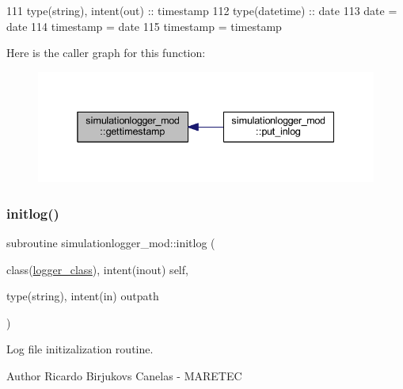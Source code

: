 \begin{DoxyCode}
111     \textcolor{keywordtype}{type}(string), \textcolor{keywordtype}{intent(out)} :: timestamp
112     \textcolor{keywordtype}{type}(datetime) :: date   
113     date = date%
114     timestamp = date%
115     timestamp = timestamp%
\end{DoxyCode}
Here is the caller graph for this function\+:\nopagebreak
\begin{figure}[H]
\begin{center}
\leavevmode
\includegraphics[width=338pt]{namespacesimulationlogger__mod_abff1db7e1655cb59097146d78e650672_icgraph}
\end{center}
\end{figure}
\mbox{\label{namespacesimulationlogger__mod_aeb57075501eed504789bb5858b4e6b59}} 
\subsubsection{\texorpdfstring{initlog()}{initlog()}}
{\footnotesize\ttfamily subroutine simulationlogger\+\_\+mod\+::initlog (\begin{DoxyParamCaption}\item[{class(\mbox{\hyperlink{structsimulationlogger__mod_1_1logger__class}{logger\+\_\+class}}), intent(inout)}]{self,  }\item[{type(string), intent(in)}]{outpath }\end{DoxyParamCaption})\hspace{0.3cm}{\ttfamily [private]}}



Log file initizalization routine. 

\begin{DoxyAuthor}{Author}
Ricardo Birjukovs Canelas -\/ M\+A\+R\+E\+T\+EC 
\end{DoxyAuthor}

